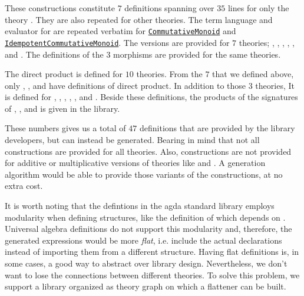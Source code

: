 These constructions constitute $7$ definitions spanning over $35$ lines for only the theory . They are also repeated for other theories. The term language and evaluator for  are repeated verbatim for 
\href{https://github.com/agda/agda-stdlib/blob/c61b159363ce2390049ce8e1e5422f61f17ec3b7/src/Algebra/Solver/CommutativeMonoid.agda}
{\lstinline|CommutativeMonoid|}
and 
\href{https://github.com/agda/agda-stdlib/blob/c61b159363ce2390049ce8e1e5422f61f17ec3b7/src/Algebra/Solver/IdempotentCommutativeMonoid.agda}
{\lstinline|IdempotentCommutativeMonoid|}. The  versions are provided for $7$ theories; , , , , , and . The definitions of the $3$ morphisms are provided for the same theories. 

The direct product is defined for $10$ theories. From the $7$ that we defined above, only , , and  have definitions of direct product. In addition to those $3$ theories, It is defined for , , , , , and . Beside these definitions, the products of the signatures of , , and  is given in the library.  

These numbers gives us a total of $47$ definitions that are provided by the library developers, but can instead be generated. Bearing in mind that not all constructions are provided for all theories. Also, constructions are not provided for additive or multiplicative versions of theories like  and . A generation algorithm would be able to provide those variants of the constructions, at no extra cost. 

It is worth noting that the defintions in the agda standard library employs modularity when defining structures, like the definition of  which depends on . Universal algebra definitions do not support this modularity and, therefore, the generated expressions would be more \emph{flat}, i.e. include the actual declarations instead of importing them from a different structure. Having flat definitions is, in some cases, a good way to abstract over library design. Nevertheless, we don't want to lose the connections between different theories. To solve this problem, we support a library organized as theory graph on which a flattener can be built.  

